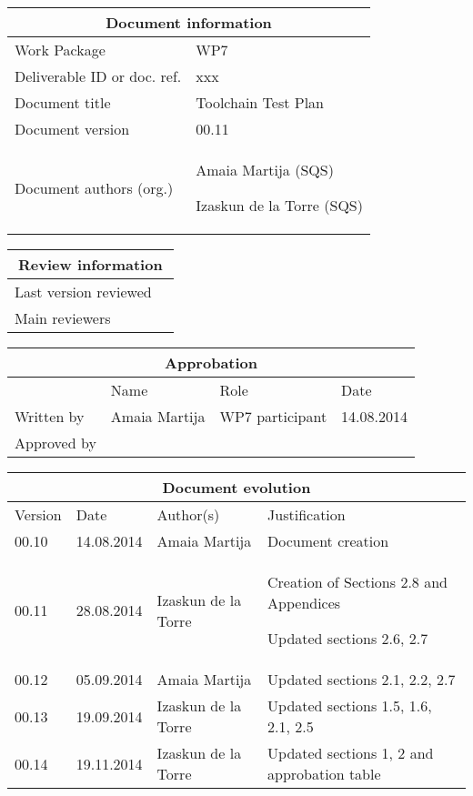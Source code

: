 \documentclass{template/openetcs_report}
\begin{document}
\begin{tabular}{|p{4.4cm}|p{8.7cm}|}
\hline
\multicolumn{2}{|c|}{Document information} \\
\hline
Work Package &  WP7  \\
Deliverable ID or doc. ref. & xxx\\
\hline
Document title & Toolchain Test Plan \\
Document version & 00.11 \\
Document authors (org.)  & Amaia Martija (SQS) 

Izaskun de la Torre (SQS)\\
\hline
\end{tabular}

\begin{tabular}{|p{4.4cm}|p{8.7cm}|}
\hline
\multicolumn{2}{|c|}{Review information} \\
\hline
Last version reviewed &  \\
\hline
Main reviewers &  \\
\hline
\end{tabular}

\begin{tabular}{|p{2.2cm}|p{4cm}|p{4cm}|p{2cm}|}
\hline
\multicolumn{4}{|c|}{Approbation} \\
\hline
  &  Name & Role & Date   \\
\hline  
Written by  &  Amaia Martija & WP7 participant & 14.08.2014 \\
\hline
Approved by &  &   &  \\
\hline
\end{tabular}

\begin{tabular}{|p{2.2cm}|p{2cm}|p{3cm}|p{5cm}|}
\hline
\multicolumn{4}{|c|}{Document evolution} \\
\hline
Version &  Date & Author(s) & Justification  \\
\hline  
00.10 & 14.08.2014 & Amaia Martija  &  Document creation  \\
\hline  
00.11 & 28.08.2014 & Izaskun de la Torre  &  Creation of Sections 2.8 and Appendices

Updated sections 2.6, 2.7  \\
\hline 
00.12 & 05.09.2014 & Amaia Martija  &  Updated sections 2.1, 2.2, 2.7  \\
\hline 
00.13 & 19.09.2014 & Izaskun de la Torre  &  Updated sections 1.5, 1.6, 2.1, 2.5\\
\hline   
00.14 & 19.11.2014 & Izaskun de la Torre  &  Updated sections 1, 2 and approbation table\\
\hline   
\end{tabular}
\newpage
\end{document}
